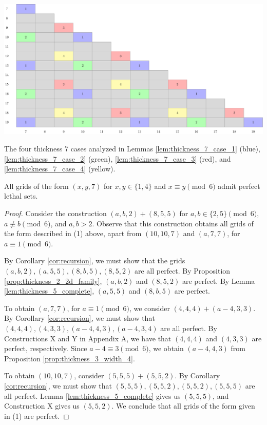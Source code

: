 \begin{table}[]
\centering
\includegraphics[width=\textwidth]{tables/4/thickness_7_cases.pdf}
\caption{The four thickness 7 cases analyzed in Lemmas \ref{lem:thickness_7_case_1} (blue), \ref{lem:thickness_7_case_2} (green), \ref{lem:thickness_7_case_3} (red), and \ref{lem:thickness_7_case_4} (yellow).}
\label{fig:thickness_7_cases}
\end{table}

\begin{lem}
\label{lem:thickness_7_case_1}
All grids of the form $(x,y,7)$ for $x,y \in \{1,4\}$ and $x \equiv y \pmod 6$ admit perfect lethal sets.
\end{lem}

\begin{proof}
Consider the construction $(a,b,2) + (8,5,5)$ for $a,b \in \{2,5\} \pmod 6$, $a \not\equiv b \pmod 6$, and $a,b > 2$. Observe that this construction obtains all grids of the form described in (1) above, apart from $(10,10,7)$ and $(a, 7,7)$, for $a \equiv 1 \pmod 6$. 

By Corollary \ref{cor:recursion}, we must show that the grids $(a,b,2), (a,5,5), (8,b,5), (8,5,2)$ are all perfect. By Proposition \ref{prop:thickness_2_2d_family}, $(a,b,2)$ and $(8,5,2)$ are perfect. By Lemma \ref{lem:thickness_5_complete}, $(a,5,5)$ and $(8,b,5)$ are perfect. 

To obtain $(a,7,7)$, for $a \equiv 1 \pmod 6$, we consider $(4,4,4) + (a-4,3,3)$. By Corollary \ref{cor:recursion}, we must show that $(4,4,4), (4,3,3), (a-4,4,3), (a-4,3,4)$ are all perfect. By Constructions X and Y in Appendix A, we have that $(4,4,4)$ and $(4,3,3)$ are perfect, respectively. Since $a-4 \equiv 3 \pmod 6$, we obtain $(a-4,4,3)$ from Proposition \ref{prop:thickness_3_width_4}.

To obtain $(10,10,7)$, consider $(5,5,5) + (5,5,2)$. By Corollary \ref{cor:recursion}, we must show that $(5,5,5), (5,5,2), (5,5,2), (5,5,5)$ are all perfect. Lemma \ref{lem:thickness_5_complete} gives us $(5,5,5)$, and Construction X gives us $(5,5,2)$. We conclude that all grids of the form given in (1) are perfect. 
\end{proof}

